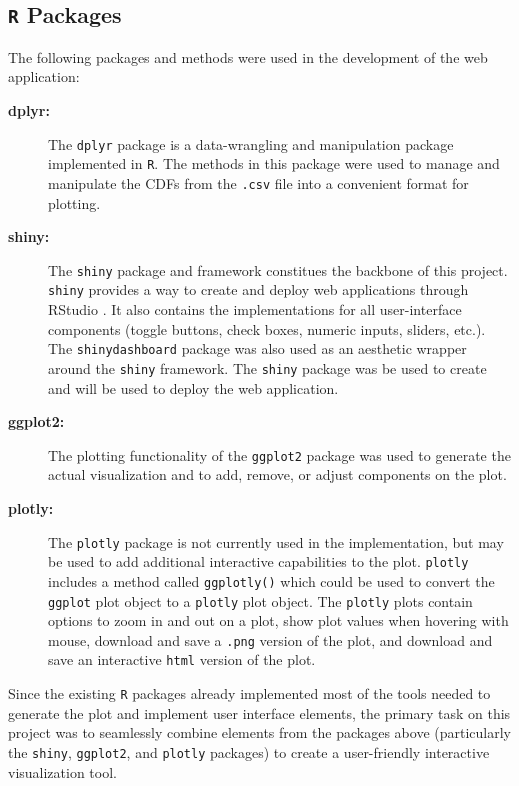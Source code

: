 \documentclass[11pt]{asaproc}\usepackage[]{graphicx}\usepackage[]{color}
\begin{document}
\subsection{{\tt R} Packages}
The following packages and methods were used in the development of the web application:

\begin{description}

\item[{\bf dplyr:}] The {\tt dplyr} package \citep{DPLYR} is a data-wrangling and manipulation package implemented in {\tt R}. The methods in this package were used to manage and manipulate the CDFs from the {\tt .csv} file into a convenient format for plotting. 

\item[{\bf shiny:}] The {\tt shiny} package and framework \citep{SHINY} constitues the backbone of this project. {\tt shiny} provides a way to create and deploy web applications through RStudio \citep{RSTUDIO}. It also contains the implementations for all user-interface components (toggle buttons, check boxes, numeric inputs, sliders, etc.). The {\tt shinydashboard} package \citep{DASH} was also used as an aesthetic wrapper around the {\tt shiny} framework. The {\tt shiny} package was be used to create and will be used to deploy the web application.

\item[{\bf ggplot2:}] The plotting functionality of the {\tt ggplot2} package \citep{GGPLOT} was used to generate the actual visualization and to add, remove, or adjust components on the plot. 

\item[{\bf plotly:}] The {\tt plotly} package \citep{PLOTLY} is not currently used in the implementation, but may be used to add additional interactive capabilities to the plot. {\tt plotly} includes a method called {\tt ggplotly()} which could be used to convert the {\tt ggplot} plot object to a {\tt plotly} plot object. The {\tt plotly} plots contain options to zoom in and out on a plot, show plot values when hovering with mouse, download and save a {\tt .png} version of the plot, and download and save an interactive {\tt html} version of the plot. 
\end{description}

\vspace{5mm}

Since the existing {\tt R} packages already implemented most of the tools needed to generate the plot and implement user interface elements, the primary task on this project was to seamlessly combine elements from the packages above (particularly the {\tt shiny}, {\tt ggplot2}, and {\tt plotly} packages) to create a user-friendly interactive visualization tool. 
\end{document}
